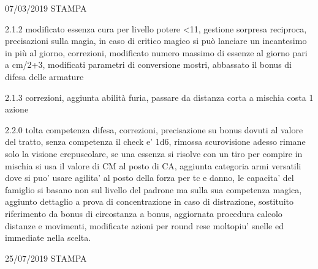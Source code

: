 \documentclass[a4paper,11pt,twoside,openany]{book}
\begin{document}
{	07/03/2019 STAMPA

	2.1.2 modificato essenza cura per livello potere \textless11, gestione sorpresa reciproca, precisazioni sulla magia, in caso di critico magico si può lanciare un incantesimo in più al giorno, correzioni, modificato numero massimo di essenze al giorno pari a cm/2+3, modificati parametri di conversione mostri, abbassato il bonus di difesa delle armature

	2.1.3 correzioni, aggiunta abilità furia, passare da distanza corta a mischia costa 1 azione

	2.2.0 tolta competenza difesa, correzioni, precisazione su bonus dovuti al valore del tratto, senza competenza il check e’ 1d6, rimossa scurovisione adesso rimane solo la visione crepuscolare, se una essenza si risolve con un tiro per compire in mischia si usa il valore di CM al posto di CA, aggiunta categoria armi versatili dove si puo’ usare agilita’ al posto della forza per tc e danno, le capacita’ del famiglio si basano non sul livello del padrone ma sulla sua competenza magica, aggiunto dettaglio a prova di concentrazione in caso di distrazione, sostituito riferimento da bonus di circostanza a bonus, aggiornata procedura calcolo distanze e movimenti, modificate azioni per round rese moltopiu’ snelle ed immediate nella scelta.

	25/07/2019 STAMPA

}
\end{document}
